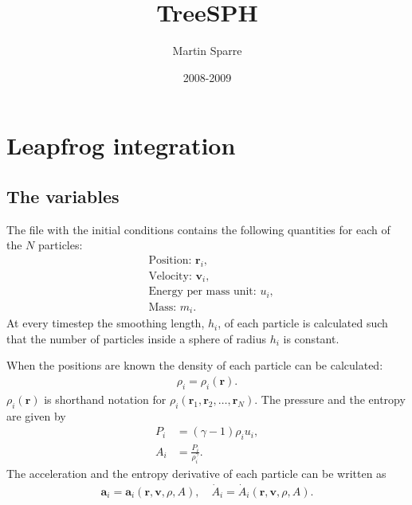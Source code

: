 \documentclass[11pt,a4paper]{article} %
\title{TreeSPH}
\author{Martin Sparre}
\date{2008-2009}
\newcommand{\mb}[1]{\mathbf{#1}}
\begin{document}


{} %
\section*{Leapfrog integration}
\subsection*{The variables}
The file with the initial conditions contains the following quantities for each of the $N$ particles:
\begin{align*}
&\text{Position: }\mb{r}_i,\\
&\text{Velocity: }\mb{v}_i,\\
&\text{Energy per mass unit: } u_i,\\
&\text{Mass: } m_i.
\end{align*}
At every timestep the smoothing length, $h_i$, of each particle is calculated such that the number of
particles inside a sphere of radius $h_i$ is constant.
 
When the positions are known the density of each particle can be calculated:
\begin{align*}
\rho_i=\rho_i (\mb{r}).
\end{align*}
$\rho_i (\mb{r}) $ is shorthand notation for $\rho_i (\mb{r}_1,\mb{r}_2,\ldots ,\mb{r}_N ) $. The pressure and the entropy are given by
\begin{align*}
P_i&=(\gamma-1)\rho_i u_i,\\
A_i &= \frac{P_i}{\rho_i^\gamma}.
\end{align*} 
The acceleration and the entropy derivative of each particle can be written as
\begin{align*}
\mb{a}_i = \mb{a}_i (\mb{r},\mb{v},\rho ,A ),
\quad \dot{A}_i = \dot{A}_i(\mb{r},\mb{v},\rho ,A ).
\end{align*}
\end{document}
